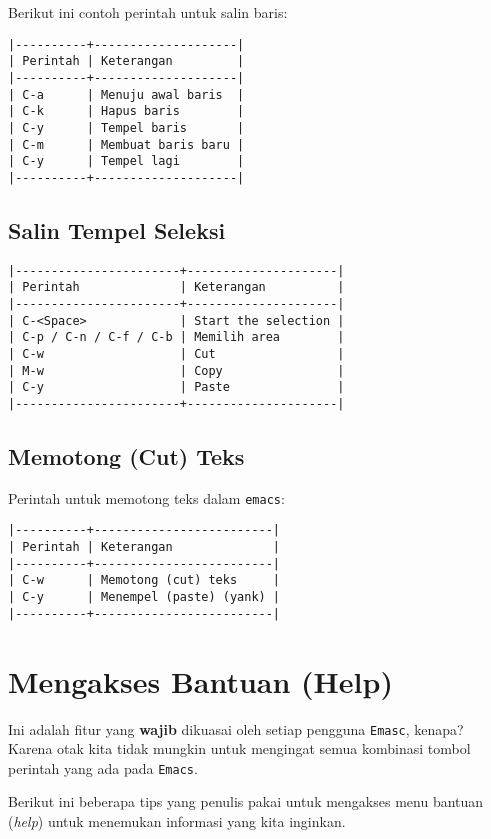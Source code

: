 \documentclass{article}
\begin{document}
Berikut ini contoh perintah untuk salin baris:

\begin{verbatim}
|----------+--------------------|
| Perintah | Keterangan         |
|----------+--------------------|
| C-a      | Menuju awal baris  |
| C-k      | Hapus baris        |
| C-y      | Tempel baris       |
| C-m      | Membuat baris baru |
| C-y      | Tempel lagi        |
|----------+--------------------|
\end{verbatim}

\subsection{Salin Tempel Seleksi}

\begin{verbatim}
|-----------------------+---------------------|
| Perintah              | Keterangan          |
|-----------------------+---------------------|
| C-<Space>             | Start the selection |
| C-p / C-n / C-f / C-b | Memilih area        |
| C-w                   | Cut                 |
| M-w                   | Copy                |
| C-y                   | Paste               |
|-----------------------+---------------------|
\end{verbatim}

\subsection{Memotong (Cut) Teks}

Perintah untuk memotong teks dalam \verb=emacs=:

\begin{verbatim}
|----------+-------------------------|
| Perintah | Keterangan              |
|----------+-------------------------|
| C-w      | Memotong (cut) teks     |
| C-y      | Menempel (paste) (yank) |
|----------+-------------------------|
\end{verbatim}

\section{Mengakses Bantuan (Help)}
Ini adalah fitur yang \textbf{wajib} dikuasai oleh setiap pengguna 
\verb=Emasc=, kenapa? Karena otak kita tidak mungkin untuk mengingat
semua kombinasi tombol perintah yang ada pada \verb=Emacs=.

Berikut ini beberapa tips yang penulis pakai untuk mengakses menu bantuan
(\emph{help}) untuk menemukan informasi yang kita inginkan.
\end{document}
